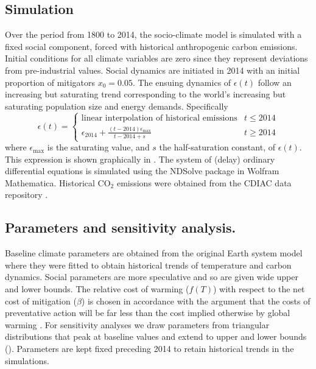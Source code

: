 \documentclass[10pt,letterpaper]{article}
\begin{document}
\subsection*{Simulation} Over the period from 1800 to 2014, the socio-climate model is simulated with a fixed social component, forced with historical anthropogenic carbon emissions. Initial conditions for all climate variables are zero since they represent deviations from pre-industrial values. Social dynamics are initiated in 2014 with an initial proportion of mitigators $x_0=0.05$. The ensuing dynamics of $\epsilon(t)$ follow an increasing but saturating trend corresponding to the world's increasing but saturating population size and energy demands. Specifically
\begin{equation}
\epsilon(t) = 
\begin{cases}
\text{linear interpolation of historical emissions} & t\leq 2014 \\[5pt]
\epsilon_{2014} + \frac{(t-2014)\epsilon_{\text{max}}}{t-2014+s} & t \geq 2014
\end{cases}
\end{equation}
where $\epsilon_{\text{max}}$ is the saturating value, and $s$ the half-saturation constant, of $\epsilon(t)$. This expression is shown graphically in . The system of (delay) ordinary differential equations is simulated using the NDSolve package in Wolfram Mathematica. Historical $\text{CO}_2$ emissions were obtained from the CDIAC data repository \cite{boden17}. 





\subsection*{Parameters and sensitivity analysis.} Baseline climate parameters are obtained from the original Earth system model \cite{lenton00} where they were fitted to obtain historical trends of temperature and carbon dynamics. Social parameters are more speculative and so are given wide upper and lower bounds. The relative cost of warming ($f(T)$) with respect to the net cost of mitigation ($\beta$) is chosen in accordance with the argument that the costs of preventative action will be far less than the cost implied otherwise by global warming \cite{stern06}. For sensitivity analyses we draw parameters from triangular distributions that peak at baseline values and extend to upper and lower bounds (). Parameters are kept fixed preceding 2014 to retain historical trends in the simulations.
\end{document}
